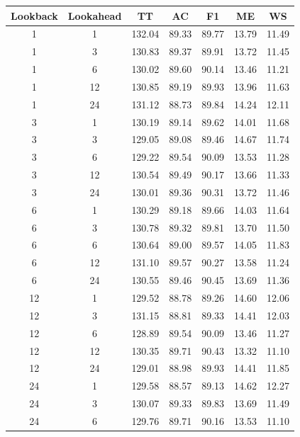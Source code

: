 \newpage
\begin{table}[H]
	\centering
	\begin{tabular}{|c|c||c|c|c|c|c|}
		\hline
		\textbf{Lookback} & \textbf{Lookahead} & \textbf{TT} & \textbf{AC} & \textbf{F1} & \textbf{ME} & \textbf{WS} \\
		\hline \hline
		 1 &  1 & 132.04 & 89.33 & 89.77 & 13.79 & 11.49 \\
		\hline
		 1 &  3 & 130.83 & 89.37 & 89.91 & 13.72 & 11.45 \\
		\hline
		 1 &  6 & 130.02 & 89.60 & 90.14 & 13.46 & 11.21 \\
		\hline
		 1 & 12 & 130.85 & 89.19 & 89.93 & 13.96 & 11.63 \\
		\hline
		 1 & 24 & 131.12 & 88.73 & 89.84 & 14.24 & 12.11 \\
		\hline
		 3 &  1 & 130.19 & 89.14 & 89.62 & 14.01 & 11.68 \\
		\hline
		 3 &  3 & 129.05 & 89.08 & 89.46 & 14.67 & 11.74 \\
		\hline
		 3 &  6 & 129.22 & 89.54 & 90.09 & 13.53 & 11.28 \\
		\hline
		 3 & 12 & 130.54 & 89.49 & 90.17 & 13.66 & 11.33 \\
		\hline
		 3 & 24 & 130.01 & 89.36 & 90.31 & 13.72 & 11.46 \\
		\hline
		 6 &  1 & 130.29 & 89.18 & 89.66 & 14.03 & 11.64 \\
		\hline
		 6 &  3 & 130.78 & 89.32 & 89.81 & 13.70 & 11.50 \\
		\hline
		 6 &  6 & 130.64 & 89.00 & 89.57 & 14.05 & 11.83 \\
		\hline
		 6 & 12 & 131.10 & 89.57 & 90.27 & 13.58 & 11.24 \\
		\hline
		 6 & 24 & 130.55 & 89.46 & 90.45 & 13.69 & 11.36 \\
		\hline
		12 &  1 & 129.52 & 88.78 & 89.26 & 14.60 & 12.06 \\
		\hline
		12 &  3 & 131.15 & 88.81 & 89.33 & 14.41 & 12.03 \\
		\hline
		12 &  6 & 128.89 & 89.54 & 90.09 & 13.46 & 11.27 \\
		\hline
		12 & 12 & 130.35 & 89.71 & 90.43 & 13.32 & 11.10 \\
		\hline
		12 & 24 & 129.01 & 88.98 & 89.93 & 14.41 & 11.85 \\
		\hline
		24 &  1 & 129.58 & 88.57 & 89.13 & 14.62 & 12.27 \\
		\hline
		24 &  3 & 130.07 & 89.33 & 89.83 & 13.69 & 11.49 \\
		\hline
		24 &  6 & 129.76 & 89.71 & 90.16 & 13.53 & 11.10 \\

\end{tabular}
\end{table}
